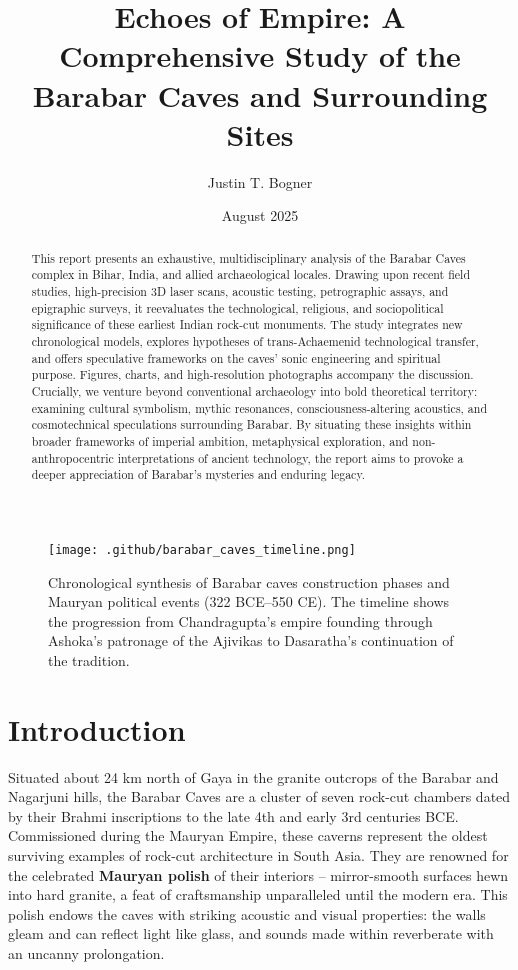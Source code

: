\documentclass[11pt]{article}
\title{\textbf{Echoes of Empire: A Comprehensive Study of the Barabar Caves and Surrounding Sites}}
\author[1]{Justin T. Bogner}
\affil[1]{Independent Researcher, Pelican's Perspective}
\date{August 2025}
\begin{document}
\maketitle

\begin{abstract}
This report presents an exhaustive, multidisciplinary analysis of the Barabar Caves complex in Bihar, India, and allied archaeological locales. Drawing upon recent field studies, high-precision 3D laser scans, acoustic testing, petrographic assays, and epigraphic surveys, it reevaluates the technological, religious, and sociopolitical significance of these earliest Indian rock-cut monuments. The study integrates new chronological models, explores hypotheses of trans-Achaemenid technological transfer, and offers speculative frameworks on the caves' sonic engineering and spiritual purpose. Figures, charts, and high-resolution photographs accompany the discussion. Crucially, we venture beyond conventional archaeology into bold theoretical territory: examining cultural symbolism, mythic resonances, consciousness-altering acoustics, and cosmotechnical speculations surrounding Barabar. By situating these insights within broader frameworks of imperial ambition, metaphysical exploration, and non-anthropocentric interpretations of ancient technology, the report aims to provoke a deeper appreciation of Barabar's mysteries and enduring legacy.
\end{abstract}

\tableofcontents
\newpage

\begin{figure}[H]
\centering
\texttt{[image: .github/barabar\_caves\_timeline.png]}
\caption{Chronological synthesis of Barabar caves construction phases and Mauryan political events (322 BCE–550 CE). The timeline shows the progression from Chandragupta's empire founding through Ashoka's patronage of the Ajivikas to Dasaratha's continuation of the tradition.}
\label{fig:timeline}
\end{figure}

\section{Introduction}

Situated about 24 km north of Gaya in the granite outcrops of the Barabar and Nagarjuni hills, the Barabar Caves are a cluster of seven rock-cut chambers dated by their Brahmi inscriptions to the late 4th and early 3rd centuries BCE. Commissioned during the Mauryan Empire, these caverns represent the oldest surviving examples of rock-cut architecture in South Asia. They are renowned for the celebrated \textbf{Mauryan polish} of their interiors -- mirror-smooth surfaces hewn into hard granite, a feat of craftsmanship unparalleled until the modern era. This polish endows the caves with striking acoustic and visual properties: the walls gleam and can reflect light like glass, and sounds made within reverberate with an uncanny prolongation.
\end{document}
